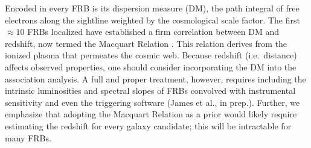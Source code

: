 \documentclass[twocolumn,linenumbers]{aastex63}
\newcommand{\mhalflight}{\phi} %
\newcommand{\halflight}{$\mhalflight$}
\begin{document}




Encoded in every FRB is its dispersion measure (DM),
the path integral of free electrons along the sightline
weighted by the cosmological scale factor.  The first
$\approx 10$ FRBs localized have established a 
firm correlation between DM and redshift, 
now termed the Macquart Relation \citep{Macquart20}.
This relation derives from the ionized plasma
that permeates the cosmic web.
Because redshift (i.e.\ distance)
affects observed properties, one
should consider incorporating the DM
into the association analysis. 
A full and proper treatment, however, requires including
the intrinsic luminosities and spectral slopes of FRBs 
convolved with instrumental sensitivity and even the
triggering software (James et al., in prep.).
Further, we emphasize that adopting the Macquart Relation
as a prior would likely require estimating the redshift
for every galaxy candidate;  this will be intractable
for many FRBs.
\end{document}
